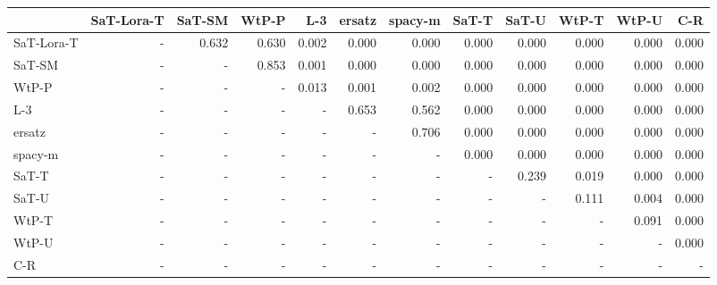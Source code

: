 \begin{tabular}{lrrrrrrrrrrr}
\toprule
 & SaT-Lora-T & SaT-SM & WtP-P & L-3 & ersatz & spacy-m & SaT-T & SaT-U & WtP-T & WtP-U & C-R \\
\midrule
SaT-Lora-T & - & 0.632 & 0.630 & 0.002 & 0.000 & 0.000 & 0.000 & 0.000 & 0.000 & 0.000 & 0.000 \\
SaT-SM & - & - & 0.853 & 0.001 & 0.000 & 0.000 & 0.000 & 0.000 & 0.000 & 0.000 & 0.000 \\
WtP-P & - & - & - & 0.013 & 0.001 & 0.002 & 0.000 & 0.000 & 0.000 & 0.000 & 0.000 \\
L-3 & - & - & - & - & 0.653 & 0.562 & 0.000 & 0.000 & 0.000 & 0.000 & 0.000 \\
ersatz & - & - & - & - & - & 0.706 & 0.000 & 0.000 & 0.000 & 0.000 & 0.000 \\
spacy-m & - & - & - & - & - & - & 0.000 & 0.000 & 0.000 & 0.000 & 0.000 \\
SaT-T & - & - & - & - & - & - & - & 0.239 & 0.019 & 0.000 & 0.000 \\
SaT-U & - & - & - & - & - & - & - & - & 0.111 & 0.004 & 0.000 \\
WtP-T & - & - & - & - & - & - & - & - & - & 0.091 & 0.000 \\
WtP-U & - & - & - & - & - & - & - & - & - & - & 0.000 \\
C-R & - & - & - & - & - & - & - & - & - & - & - \\
\bottomrule
\end{tabular}

